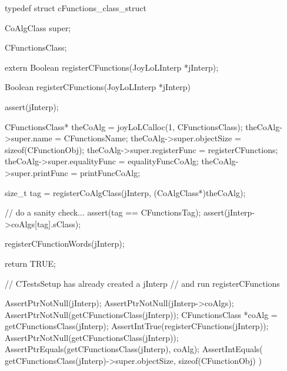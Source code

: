 \startTestSuite[registerCFunctions]

\startCHeader
typedef struct cFunctions_class_struct {
  CoAlgClass super;
  
} CFunctionsClass;
\stopCHeader

\startCHeader
extern Boolean registerCFunctions(JoyLoLInterp *jInterp);
\stopCHeader
{}

\startCCode
Boolean registerCFunctions(JoyLoLInterp *jInterp) {
  assert(jInterp);
  
  CFunctionsClass* theCoAlg    =
    joyLoLCalloc(1, CFunctionsClass);
  theCoAlg->super.name         = CFunctionsName;
  theCoAlg->super.objectSize   = sizeof(CFunctionObj);
  theCoAlg->super.registerFunc = registerCFunctions;
  theCoAlg->super.equalityFunc = equalityFuncCoAlg;
  theCoAlg->super.printFunc    = printFuncCoAlg;
  
  size_t tag =
    registerCoAlgClass(jInterp, (CoAlgClass*)theCoAlg);

  // do a sanity check...
  assert(tag == CFunctionsTag);
  assert(jInterp->coAlgs[tag].sClass);
  
  registerCFunctionWords(jInterp);
  
  return TRUE;
}
\stopCCode


\startCTest
  // CTestsSetup has already created a jInterp
  // and run registerCFunctions
  
  AssertPtrNotNull(jInterp);
  AssertPtrNotNull(jInterp->coAlgs);
  AssertPtrNotNull(getCFunctionsClass(jInterp));
  CFunctionsClass *coAlg =
    getCFunctionsClass(jInterp);
  AssertIntTrue(registerCFunctions(jInterp));
  AssertPtrNotNull(getCFunctionsClass(jInterp));
  AssertPtrEquals(getCFunctionsClass(jInterp), coAlg);
  AssertIntEquals(
    getCFunctionsClass(jInterp)->super.objectSize,
    sizeof(CFunctionObj)
  )
\stopCTest
\stopTestCase
\stopTestSuite